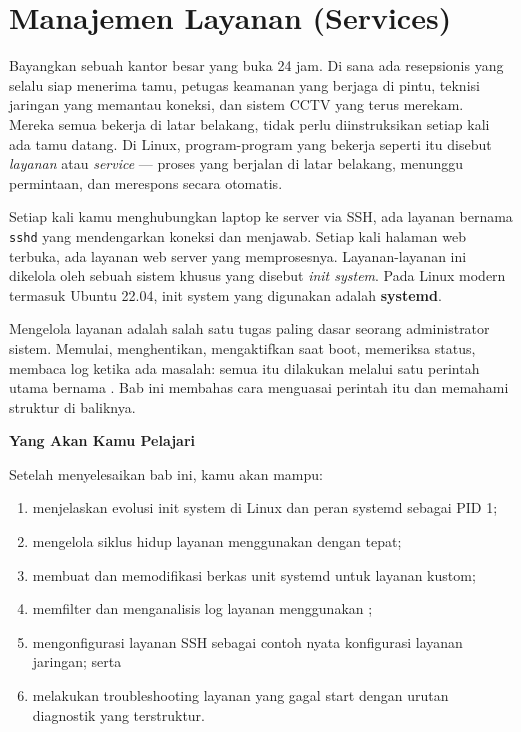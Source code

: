 
\chapter{Manajemen Layanan (Services)}
\label{ch:service-management}

Bayangkan sebuah kantor besar yang buka 24 jam. Di sana ada resepsionis yang selalu siap menerima tamu, petugas keamanan yang berjaga di pintu, teknisi jaringan yang memantau koneksi, dan sistem CCTV yang terus merekam. Mereka semua bekerja di latar belakang, tidak perlu diinstruksikan setiap kali ada tamu datang. Di Linux, program-program yang bekerja seperti itu disebut \textit{layanan} atau \textit{service} — proses yang berjalan di latar belakang, menunggu permintaan, dan merespons secara otomatis.

Setiap kali kamu menghubungkan laptop ke server via SSH, ada layanan bernama \texttt{sshd} yang mendengarkan koneksi dan menjawab. Setiap kali halaman web terbuka, ada layanan web server yang memprosesnya. Layanan-layanan ini dikelola oleh sebuah sistem khusus yang disebut \textit{init system}. Pada Linux modern termasuk Ubuntu 22.04, init system yang digunakan adalah \textbf{systemd}.

Mengelola layanan adalah salah satu tugas paling dasar seorang administrator sistem. Memulai, menghentikan, mengaktifkan saat boot, memeriksa status, membaca log ketika ada masalah: semua itu dilakukan melalui satu perintah utama bernama . Bab ini membahas cara menguasai perintah itu dan memahami struktur di baliknya.

\textbf{Yang Akan Kamu Pelajari}

Setelah menyelesaikan bab ini, kamu akan mampu:

\begin{enumerate}
    \item menjelaskan evolusi init system di Linux dan peran systemd sebagai PID 1;
    \item mengelola siklus hidup layanan menggunakan  dengan tepat;
    \item membuat dan memodifikasi berkas unit systemd untuk layanan kustom;
    \item memfilter dan menganalisis log layanan menggunakan ;
    \item mengonfigurasi layanan SSH sebagai contoh nyata konfigurasi layanan jaringan; serta
    \item melakukan troubleshooting layanan yang gagal start dengan urutan diagnostik yang terstruktur.
\end{enumerate}

